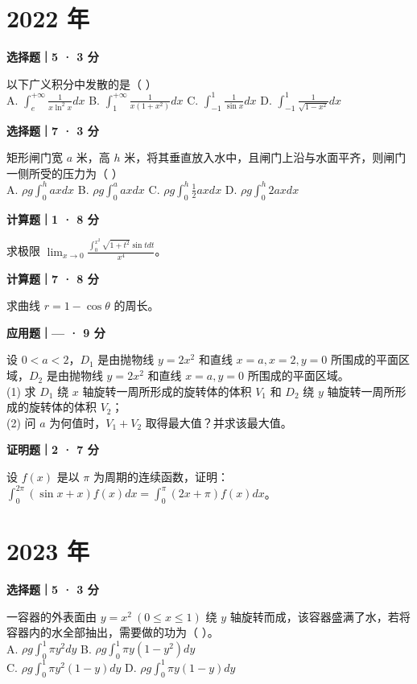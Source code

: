 \section*{2022 年}


\textbf{选择题｜5 · 3 分}

以下广义积分中发散的是（ \quad ）\\
A. $\int_e^{+\infty} \frac{1}{x\ln^2 x} dx$ \quad B. $\int_1^{+\infty} \frac{1}{x(1+x^2)} dx$ \quad C. $\int_{-1}^1 \frac{1}{\sin x} dx$ \quad D. $\int_{-1}^1 \frac{1}{\sqrt{1-x^2}} dx$


\textbf{选择题｜7 · 3 分}

矩形闸门宽 $a$ 米，高 $h$ 米，将其垂直放入水中，且闸门上沿与水面平齐，则闸门一侧所受的压力为（ \quad ）\\
A. $\rho g \int_0^h ax dx$ \quad B. $\rho g \int_0^a ax dx$ \quad C. $\rho g \int_0^h \frac{1}{2} ax dx$ \quad D. $\rho g \int_0^h 2ax dx$


\textbf{计算题｜1 · 8 分}

求极限 $\lim_{x \to 0} \frac{\int_0^{x^2} \sqrt{1+t^2} \sin t dt}{x^4}$。


\textbf{计算题｜7 · 8 分}

求曲线 $r = 1 - \cos\theta$ 的周长。


\textbf{应用题｜— · 9 分}

设 $0 < a < 2$，$D_1$ 是由抛物线 $y = 2x^2$ 和直线 $x = a, x = 2, y = 0$ 所围成的平面区域，$D_2$ 是由抛物线 $y = 2x^2$ 和直线 $x = a, y = 0$ 所围成的平面区域。\\
(1) 求 $D_1$ 绕 $x$ 轴旋转一周所形成的旋转体的体积 $V_1$ 和 $D_2$ 绕 $y$ 轴旋转一周所形成的旋转体的体积 $V_2$；\\
(2) 问 $a$ 为何值时，$V_1 + V_2$ 取得最大值？并求该最大值。


\textbf{证明题｜2 · 7 分}

设 $f(x)$ 是以 $\pi$ 为周期的连续函数，证明：$\int_0^{2\pi} (\sin x + x)f(x) dx = \int_0^\pi (2x + \pi)f(x) dx$。


\section*{2023 年}


\textbf{选择题｜5 · 3 分}

一容器的外表面由 $y = x^2 \ (0 \le x \le 1)$ 绕 $y$ 轴旋转而成，该容器盛满了水，若将容器内的水全部抽出，需要做的功为（ \quad ）。\\
A. $\rho g \int_0^1 \pi y^2 dy$ \quad B. $\rho g \int_0^1 \pi y(1-y^2) dy$\\
C. $\rho g \int_0^1 \pi y^2(1-y) dy$ \quad D. $\rho g \int_0^1 \pi y(1-y) dy$


